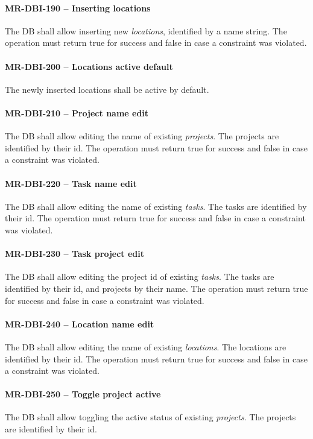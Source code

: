 \paragraph{MR-DBI-190 -- Inserting locations}
The \gls{DB} shall allow inserting new \emph{locations}, identified by a name
string. The operation must return true for success and false in case a
constraint was violated.

\paragraph{MR-DBI-200 -- Locations active default}
The newly inserted locations shall be active by default.

\paragraph{MR-DBI-210 -- Project name edit}
The \gls{DB} shall allow editing the name of existing \emph{projects}.
The projects are identified by their id. The operation must return true for
success and false in case a constraint was violated.

\paragraph{MR-DBI-220 -- Task name edit}
The \gls{DB} shall allow editing the name of existing \emph{tasks}.
The tasks are identified by their id. The operation must return true for success
and false in case a constraint was violated.

\paragraph{MR-DBI-230 -- Task project edit}
The \gls{DB} shall allow editing the project id of existing \emph{tasks}.
The tasks are identified by their id, and projects by their name.
The operation must return true for success and false in case a
constraint was violated.

\paragraph{MR-DBI-240 -- Location name edit}
The \gls{DB} shall allow editing the name of existing \emph{locations}.
The locations are identified by their id.
The operation must return true for success and false in case a
constraint was violated.

\paragraph{MR-DBI-250 -- Toggle project active}
The \gls{DB} shall allow toggling the active status of existing \emph{projects}.
The projects are identified by their id.

